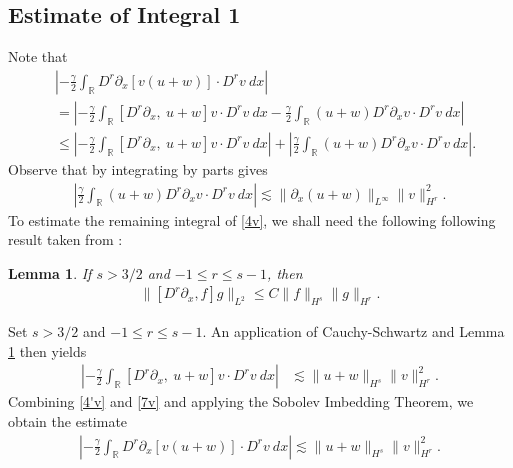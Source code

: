 \documentclass[12pt,reqno]{amsart}
\numberwithin{equation}{section}  %
\newcommand{\rr}{\mathbb{R}}
\newcommand{\p}{\partial}
\newtheorem{lemma}[theorem]{Lemma}
\begin{document}
\subsection{Estimate of Integral 1} Note that
%
%
\begin{equation}
\begin{split}
& \left |  -\frac{\gamma}{2} \int_{\rr} D^r \p_x [v(u+w)] \cdot
D^r v \ dx \right |
\\
& =
\left |
-\frac{\gamma}{2} \int_{\rr} \left[ D^r \p_x, \ u+w \right]v \cdot
D^r v \ dx - \frac{\gamma}{2} \int_{\rr} (u+w) D^r
\p_x v \cdot D^r v\ dx
\right | \\
& \le \left |
-\frac{\gamma}{2} \int_{\rr} \left[ D^r \p_x, \ u+w \right]v \cdot
D^r v \ dx \right |
+ \left | \frac{\gamma}{2} \int_{\rr} (u+w) D^r \p_x v
\cdot D^r v\
dx \right |.
\label{4v}
\end{split}
\end{equation}
%
%
Observe that by integrating by parts gives
%
%
\begin{equation}
\begin{split}
\left | \frac{\gamma}{2}\int_{\rr} (u+w) D^r \p_x v \cdot
D^r v \ dx \right |
\lesssim \|\p_x (u+w)\|_{L^\infty}
\|v\|_{H^r}^2.
\label{4'v}
\end{split}
\end{equation}
%
%
%
%
To estimate the remaining integral of \eqref{4v}, we shall need the following
following result taken from \cite{Himonas_2009_Non-uniform-dep-per}:
%
\begin{lemma}
\label{cor1}
If $s > 3/2$ and $-1 \le r  \le s -1$, then
%
%
\begin{equation}
\begin{split}
\|[D^r \p_x ,f]g\|_{L^2} \le C \|f\|_{H^s} \|g\|_{H^r}.
\label{15}
\end{split}
\end{equation}
%
%
\end{lemma}
%
%
Set $s > 3/2$ and $-1 \le r \le s -1$. An application of 
Cauchy-Schwartz and Lemma \ref{cor1} then yields 
%
%
\begin{equation}
\begin{split}
 \left | -\frac{\gamma}{2} \int_{\rr} [D^r \p_x, \ u+w] v
\cdot D^r v \ dx \right |
& \lesssim \|u+w\|_{H^s} 
\|v\|_{H^r}^2.
\label{7v}
\end{split}
\end{equation}
%
%
Combining \eqref{4'v} and \eqref{7v} and applying the Sobolev Imbedding 
Theorem, we obtain the estimate
%
%
\begin{equation}
\begin{split}
\left |  -\frac{\gamma}{2} \int_{\rr} D^r \p_x [v(u+w)] \cdot
D^r v \ dx \right |
 \lesssim \|u+w\|_{H^s} \|v\|_{H^r}^2.
\label{8v}
\end{split}
\end{equation}
%
%
\end{document}
